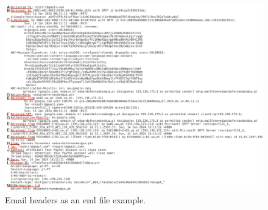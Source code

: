 \begin{figure}[H]
  \includegraphics[width=\linewidth]{figs/eml.png}
  \caption[EML file example]{Email headers as an \ac{eml} file example.}
  \label{fig:c2:eml}
\end{figure}
